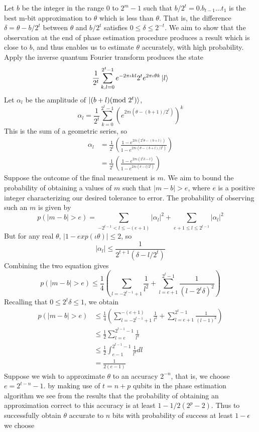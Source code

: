 Let $b$ be the integer in the range $0$ to $2^m-1$ such that $b/2^t =0.b_{t-1}\ldots t_1$ is the best m-bit approximation to $\theta$ which is less than $\theta$. That is, the difference $\delta = \theta - b/2^t$ between $\theta$ and $b/2^t$ satisfies $0\leq \delta \leq 2^{-t}$. We aim to show that the observation at the end of phase estimation procedure produces a result which is close to $b$, and thus enables us to estimate $\theta$ accurately, with high probability. Apply the inverse quantum Fourier transform produces the state
\[
\frac{1}{2^t}\sum_{k,l=0}^{2^t-1} e^{-2\pi\iota kl}{2^t} e^{2\pi\iota \theta k}\ket{l}
\]
Let $\alpha_l$ be the amplitude of $\ket{(b+l)(\text{mod }2^t)}$,
\[
\alpha_l = \frac{1}{2^t}\sum_{k=0}^{2^t-1}\left(e^{2\pi\iota(\theta - (b+1)/2^t)}\right)^k
\]
This is the sum of a geometric series, so
\begin{align*}
\alpha_l &= \frac{1}{2^t}\left(\frac{1-e^{2\pi\iota (2^t\theta - (b+l))}}{1-e^{2\pi\iota(\theta-(b+l)/2^t)}}\right)\\
&=\frac{1}{2^t} \left(\frac{1-e^{2\pi\iota(2^t\delta -l)}}{1-e^{2\pi\iota(\delta-l/2^t)}}\right)
\end{align*}
Suppose the outcome of the final measurement is $m$. We aim to bound the probability of obtaining a values of $m$ such that $|m-b| >e$, where $e$ is a positive integer characterizing our desired tolerance to error. The probability of observing such an $m$ is given by
\[
p(|m-b|>e) = \sum_{-2^{t-1}<l\leq-(e+1)} |\alpha_l|^2 + \sum_{e+1 \leq l \leq 2^{t-1}} |\alpha_l|^2
\]
But for any real $\theta$, $|1-exp(\iota\theta)|\leq 2$, so
\[
|\alpha_l|\leq \frac{1}{2^{t+1}(\delta - l/2^t)}
\]
Combining the two equation gives
\[
p(|m-b|>e) \leq \frac{1}{4}\left(\sum_{l=-2^{t-1}+1} \frac{1}{l^2} + \sum_{l=e+1}^{2^t-1} \frac{1}{(l-2^t\delta)^2}\right)
\]
Recalling that $0\leq 2^t\delta \leq 1$, we obtain
\begin{align*}
    p(|m-b|>e) &\leq \frac{1}{4}\left(\sum_{l=-2^{t-1}+1}^{-(e+1)}\frac{1}{l^2} + \sum_{l=e+1}^{2^t-1} \frac{1}{(l-1)^2}\right)\\
    &\leq \frac{1}{2} \sum_{l=e}^{2^{t-1}-1} \frac{1}{l^2}\\
    &\leq \frac{1}{2}\int_{e-1}^{2^{t-1}-1} \frac{1}{l^2} dl\\
    &=\frac{1}{2(e-1)}
\end{align*}
Suppose we wish to approximate $\theta$ to an accuracy $2^{-n}$, that is, we choose $e=2^{t-n}-1$. by making use of $t=n+p$ qubits in the phase estimation algorithm we see from the results that the probability of obtaining an approximation correct to this accuracy is at least $1-1/2(2^p-2)$. Thus to successfully obtain $\theta$ accurate to $n$ bits with probability of success at least $1-\epsilon$ we choose
